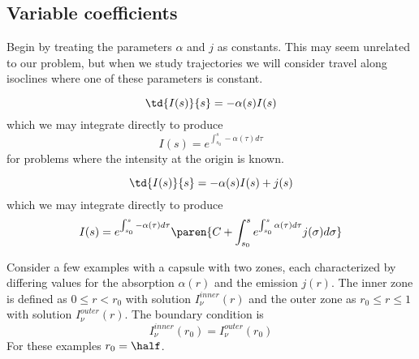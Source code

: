 \subsection{\label{variable coefficients}Variable coefficients}

Begin by treating the parameters $\alpha$ and $j$ as constants. This may seem unrelated to our problem, but when we study trajectories we will consider travel along isoclines where one of these parameters is constant.

\begin{equation}
  \td{I(s)}{s} = -\alpha(s) I(s)
\end{equation}
which we may integrate directly to produce
\begin{equation}
  I(s) = e^{\int_{s_{0}}^{s}-\alpha(\tau) d\tau}
\end{equation}
for problems where the intensity at the origin is known.


\begin{equation}
  \td{I(s)}{s} = -\alpha(s) I(s) + j(s)
\end{equation}
which we may integrate directly to produce
\begin{equation}
  I(s) = e^{\int_{s_{0}}^{s}-\alpha(\tau) d\tau} \paren{C + \int_{s_{0}}^{s} e^{\int_{s_{0}}^{s}\alpha(\tau) d\tau}j(\sigma) d\sigma}
\end{equation}

Consider a few examples with a capsule with two zones, each characterized by differing values for the absorption $\alpha(r)$ and the emission $j(r)$. The inner zone is defined as $0\le r < r_{0}$ with solution $I_{\nu}^{inner}(r)$ and the outer zone as $r_{0}\le r \le 1$ with solution $I_{\nu}^{outer}(r)$. The boundary condition is
  \begin{equation}
    I_{\nu}^{inner}(r_{0}) = I_{\nu}^{outer}(r_{0})
  \end{equation}
For these examples $r_{0} = \half$.
